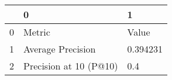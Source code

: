 \begin{tabular}{lll}
\toprule
{} &                       0 &         1 \\
\midrule
0 &                  Metric &     Value \\
1 &       Average Precision &  0.394231 \\
2 &  Precision at 10 (P@10) &       0.4 \\
\bottomrule
\end{tabular}
